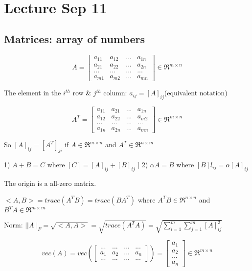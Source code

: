 \section{Lecture Sep 11}




\subsection{Matrices: array of numbers}

$$
A = 
\left[
\begin{matrix}
a_{11} & a_{12} & ... & a_{1n} \\
a_{21} & a_{22} & ... & a_{2n} \\
... & ... & ... & ...\\
a_{m1} & a_{m2} & ... & a_{mn}
\end{matrix}
\right] \in \Re^{m\times n}
$$


The element in the $i^{th}$ row \& $j^{th}$ column: $a_{ij} = [A]_{ij}$(equivalent notation)

$$
A^T = 
\left[
\begin{matrix}
a_{11} & a_{21} & ... & a_{1n} \\
a_{12} & a_{22} & ... & a_{m2} \\
... & ... & ... & ...\\
a_{1n} & a_{2n} & ... & a_{mn}
\end{matrix}
\right] \in \Re^{m\times n}
$$

So $[A]_{ij}  = [A^T]_{ji}$ if $A\in \Re^{m\times n}$ and $A^T\in \Re^{n\times m}$


1) $A + B = C$ where $[C] = [A]_{ij} + [B]_{ij}$
]
2) $\alpha A = B$ where $[B]l_{ij} = \alpha [A]_{ij}$

The origin is a all-zero matrix. 

\begin{definition}
	$<A, B> = trace(A^TB) = trace(BA^T)$ where $A^TB\in \Re^{n\times n}$ and $B^TA\in \Re^{m\times m}$
\end{definition}

Norm: $||A||_F = \sqrt{<A, A>} = \sqrt{trace(A^TA)} = \sqrt{\sum^m_{i=1}\sum^m_{j=1}[A]^2_{ij}}$

$$
vec(A) = vec(
\left[
\begin{matrix}
... & ... & ... & ... \\
a_{1} & a_{2} & ... & a_{n} \\
... & ... & ... & ...
\end{matrix}
\right]) = 
\left[
\begin{matrix}
a_{1} \\
a_{2} \\
... \\
a_{n}
\end{matrix}
\right]
\in \Re^{m\times n}
$$

